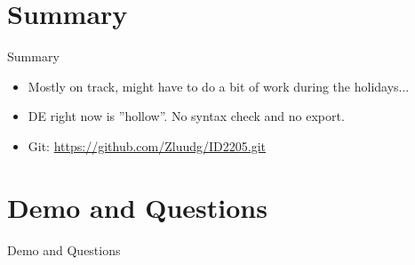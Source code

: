 \documentclass{beamer}
\begin{document}
\section*{Summary}
\begin{frame}{Summary}
\begin{itemize}
	\item Mostly on track, might have to do a bit of work during the holidays...
	\item DE right now is ''hollow''. No syntax check and no export.
	\item Git: \url{https://github.com/Zluudg/ID2205.git}
\end{itemize}
\end{frame}

\section*{Demo and Questions}
\begin{frame}{Demo and Questions}
\end{frame}
\end{document}
